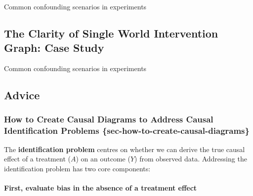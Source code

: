 \documentclass[
  single column]{article}
\let\oldparagraph\paragraph
\renewcommand{\paragraph}[1]{\oldparagraph{#1}\mbox{}}
\begin{document}
\begin{table}

\caption{\label{tbl-experiments}Common confounding scenarios in
experiments}

\centering{

\swigtable

}

\end{table}%

\newpage{}

\subsection{The Clarity of Single World Intervention Graph: Case
Study}\label{the-clarity-of-single-world-intervention-graph-case-study}

\begin{table}

\caption{\label{tbl-experiments}Common confounding scenarios in
experiments}

\centering{

\pearltable

}

\end{table}%

\newpage{}

\subsection{Advice}\label{advice}

\subsubsection{How to Create Causal Diagrams to Address Causal
Identification Problems
\{sec-how-to-create-causal-diagrams\}}\label{how-to-create-causal-diagrams-to-address-causal-identification-problems-sec-how-to-create-causal-diagrams}

The \textbf{identification problem} centres on whether we can derive the
true causal effect of a treatment (\(A\)) on an outcome (\(Y\)) from
observed data. Addressing the identification problem has two core
components:

\paragraph{First, evaluate bias in the absence of a treatment
effect}\label{first-evaluate-bias-in-the-absence-of-a-treatment-effect}
\end{document}
